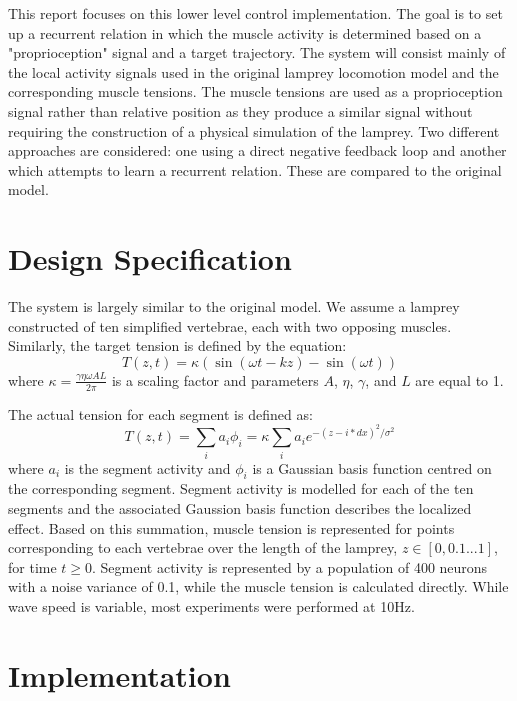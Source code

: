 \documentclass[12pt]{article}
\begin{document}
This report focuses on this lower level control implementation. The goal is to set up a recurrent relation in which the muscle activity is determined based on a "proprioception" signal and a target trajectory. The system will consist mainly of the local activity signals used in the original lamprey locomotion model and the corresponding muscle tensions. The muscle tensions are used as a proprioception signal rather than relative position as they produce a similar signal without requiring the construction of a physical simulation of the lamprey. Two different approaches are considered: one using a direct negative feedback loop and another which attempts to learn a recurrent relation. These are compared to the original model.

\newpage
\section{Design Specification}

The system is largely similar to the original model. We assume a lamprey constructed of ten simplified vertebrae, each with two opposing muscles. Similarly, the target tension is defined by the equation:
\begin{equation}
  T(z,t) = \kappa (\sin(\omega t - kz) - \sin(\omega t))
\end{equation} 
where \(\kappa = \frac{\gamma \eta \omega A L }{2\pi}\) is a scaling factor and parameters \(A\), \(\eta\), \(\gamma\), and \(L\) are equal to 1. 

The actual tension for each segment is defined as:
\begin{equation}
  T(z,t) = \sum_i a_i \phi_i = \kappa \sum_i a_i e^{-(z-i*dx)^2/\sigma^2}
\end{equation} 
where \(a_i\) is the segment activity and \(\phi_i\) is a Gaussian basis function centred on the corresponding segment. Segment activity is modelled for each of the ten segments and the associated Gaussion basis function describes the localized effect. Based on this summation, muscle tension is represented for points corresponding to each vertebrae over the length of the lamprey, \(z \in [0, 0.1 ... 1]\), for time \(t \geq 0\). Segment activity is represented by a population of 400 neurons with a noise variance of 0.1, while the muscle tension is calculated directly. While wave speed is variable, most experiments were performed at 10Hz. 

\newpage
\section{Implementation}
\end{document}
